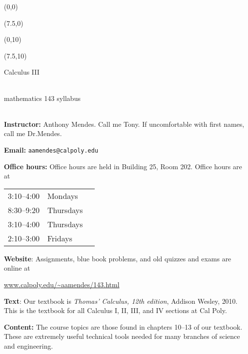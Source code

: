 \documentclass[11pt]{article}
\begin{document}
\begin{textblock}{1}(0,0)  \end{textblock}
\begin{textblock}{1}(7.5,0)  \end{textblock}
\begin{textblock}{1}(0,10)  \end{textblock}
\begin{textblock}{1}(7.5,10)  \end{textblock}

\begin{center}
  \begin{Huge}\textsf{Calculus III}\end{Huge} \\[1ex]
  mathematics 143 syllabus  \\
   \\[3ex]
\end{center}

\textbf{Instructor:} Anthony Mendes.   Call me Tony.  If uncomfortable with first names, call me
Dr.\@ Mendes. 

\textbf{Email:} \texttt{aamendes@calpoly.edu}

\textbf{Office hours:} Office hours are held in Building 25, Room 202.  Office hours are at 
\begin{center}
\begin{tabular}[t]{lll}
  3:10--4:00 & Mondays \\
  8:30--9:20 & Thursdays \\
  3:10--4:00 & Thursdays  \\
  2:10--3:00 & Fridays 
\end{tabular}
\end{center}

\textbf{Website}: Assignments, blue book problems, and old quizzes and exams are
online at
\begin{center}
\url{www.calpoly.edu/~aamendes/143.html} 
\end{center}

\textbf{Text}: Our textbook is 
\textsl{Thomas' Calculus, 12th edition}, Addison Wesley, 2010.  This is the textbook 
for all Calculus I, II, III, and IV sections at Cal Poly.

\textbf{Content:}  The course topics are those found in chapters 10--13 of our textbook.  These are
extremely useful technical tools needed for many branches of science and engineering.  
\end{document}
